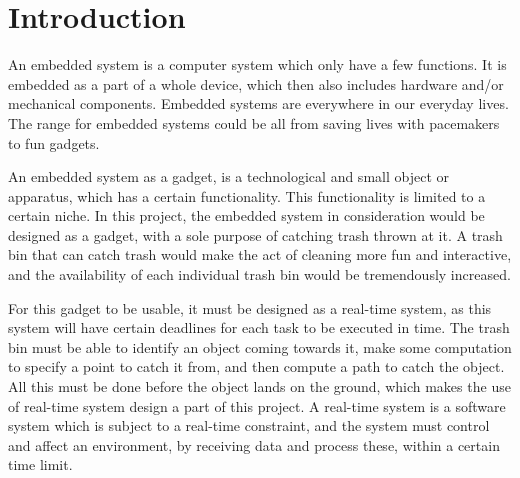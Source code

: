 \chapter{Introduction}
\label{chap:Introduction}

An embedded system is a computer system which only have a few functions. It is embedded as a part of a whole device, which then also includes hardware and/or mechanical components. Embedded systems are everywhere in our everyday lives. The range for embedded systems could be all from saving lives with pacemakers to fun gadgets.\citep{es}

An embedded system as a gadget, is a technological and small object or apparatus, which has a certain functionality. This functionality is limited to a certain niche. \newline
In this project, the embedded system in consideration would be designed as a gadget, with a sole purpose of catching trash thrown at it. A trash bin that can catch trash would make the act of cleaning more fun and interactive, and the availability of each individual trash bin would be tremendously increased.

For this gadget to be usable, it must be designed as a real-time system, as this system will have certain deadlines for each task to be executed in time. The trash bin must be able to identify an object coming towards it, make some computation to specify a point to catch it from, and then compute a path to catch the object. All this must be done before the object lands on the ground, which makes the use of real-time system design a part of this project. A real-time system is a software system which is subject to a real-time constraint, and the system must control and affect an environment, by receiving data and process these, within a certain time limit.